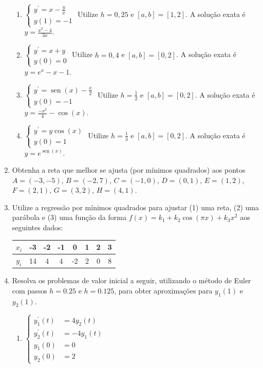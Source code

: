 \documentclass[12pt,a4paper]{article}
\newcommand*\sen{\operatorname{sen}}
\begin{document}
\begin{enumerate}
\begin{enumerate}
\item $\begin{cases}
y^\prime = x-\frac{y}{x} \\
y(1) = -1
\end{cases}$
Utilize $h = 0,25$ e $[a,b] = [1, 2]$. A solução exata é $y = \frac{x^3 - 4}{3x}$.
\item $\begin{cases}
y^\prime = x+y \\
y(0) = 0
\end{cases}$
Utilize $h = 0,4$ e $[a,b] = [0, 2]$. A solução exata é $y = e^x - x - 1$.
\item $\begin{cases}
y^\prime = \sen(x) - \frac{x}{2} \\
y(0) = -1
\end{cases}$
Utilize $h = \frac{1}{2}$ e $[a,b] = [0,2]$. A solução exata é $y = \frac{-x^2}{4} - \cos(x)$.
\item $\begin{cases}
y^\prime = y \cos(x) \\
y(0) = 1
\end{cases}$
Utilize $h = \frac{1}{3}$ e $[a,b] = [0,2]$. A solução exata é $y = e^{\sen(x)}$.
\end{enumerate}

\item Obtenha a reta que melhor se ajusta (por mínimos quadrados) aos pontos
$A = (-3, -5)$,
$B = (-2,  7)$,
$C = (-1,  0)$,
$D = ( 0,  1)$,
$E = ( 1,  2)$,
$F = ( 2,  1)$,
$G = ( 3,  2)$,
$H = ( 4,  1)$.
\item Utilize a regressão por mínimos quadrados para ajustar (1) uma reta, (2) uma parábola e (3) uma função da forma $f(x) = k_1 + k_2 \cos(\pi x) + k_3 x^2$ aos seguintes dados:
\begin{center}
\begin{tabular}{|c|c|c|c|c|c|c|c|}
\hline
   $x_i$ & -3 & -2 & -1 &  0 & 1 & 2 & 3 \\ \hline
$y_i$ & 14 &  4 &  4 & -2 & 2 & 0 & 8 \\ \hline
\end{tabular}
\end{center}
\item Resolva os problemas de valor inicial a seguir, utilizando o método de Euler com passos $h = 0.25$ e $h=0.125$, para obter aproximações para $y_1(1)$ e $y_2(1)$.
\begin{multicols}{2}
\begin{enumerate}
\item $\begin{cases}
y_1^\prime(t) &= 4y_2(t)\\
y_2^\prime(t) &= -4y_1(t)\\
y_1(0) &= 0\\
y_2(0) &= 2
\end{cases}$


\end{enumerate}
\end{multicols}
\end{enumerate}
\end{document}
